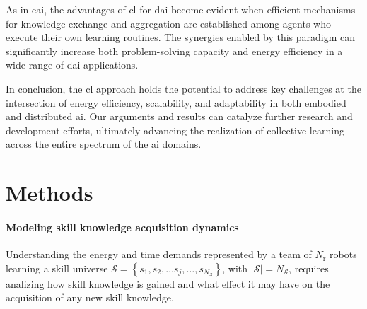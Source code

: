 \documentclass[12pt]{article}
\begin{document}
As in \ac{eai}, the advantages of \ac{cl} for \ac{dai} become evident when efficient mechanisms for knowledge exchange and aggregation are established among agents who execute their own learning routines. The synergies enabled by this paradigm can significantly increase both problem-solving capacity and energy efficiency in a wide range of \ac{dai} applications.

In conclusion, the \acl{cl} approach holds the potential to address key challenges at the intersection of energy efficiency, scalability, and adaptability in both embodied and distributed \ac{ai}. Our arguments and results can catalyze further research and development efforts, ultimately advancing the realization of collective learning across the entire spectrum of the \ac{ai} domains.

\section*{Methods}\label{sec:methods}

\paragraph*{Modeling skill knowledge acquisition dynamics}\label{sec:knowledge_dynamics_model}
Understanding the energy and time demands represented by a team of $N_\mathrm{r}$ robots learning a skill universe $\mathcal{S}=\left\lbrace s_1,s_2,\ldots s_j,\ldots, s_{N_\mathcal{S}}\right\rbrace$, with $|\mathcal{S}| = N_\mathcal{S}$, requires analizing how skill knowledge is gained and what effect it may have on the acquisition of any new skill knowledge. 
\end{document}
